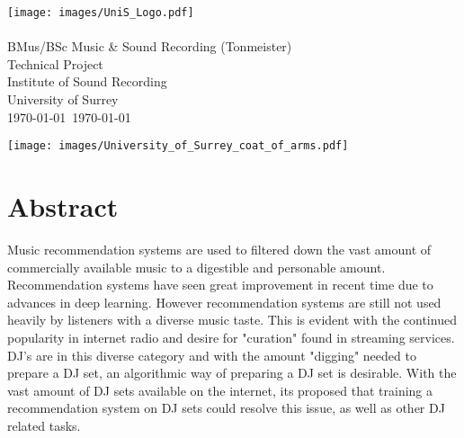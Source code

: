
\graphicspath{{FrontMatter/}}

\begin{titlepage}
\thispagestyle{empty}
\hfill\texttt{[image: images/UniS\_Logo.pdf]}
{\sf
\centering
\null\vfil\vfil
	{
		\huge\LongTitle\\
	}
\vfil\vfil\vfil
	{
		\Large\Me\\
	}
\vfil\vfil\vfil
	{
		\Large{}BMus/BSc Music \& Sound Recording (Tonmeister)\\
		Technical Project\\
	}
\vfil\vfil
	{
		\Large{}Institute of Sound Recording\\
		University of Surrey\\
	}
\vfil
	{
		\Large\MyMonth\today~\MyYear\today\\}
	}

	{
		\texttt{[image: images/University\_of\_Surrey\_coat\_of\_arms.pdf]}
		\vspace{-.4in}
	}
\end{titlepage}

\setlength{\parskip}{1ex plus 0.2ex minus 0.2ex} %
\onehalfspacing



\chapter*{Abstract}
\thispagestyle{empty}
\setcounter{page}{2}

Music recommendation systems are used to filtered down the vast amount of commercially available music to a digestible and personable amount. Recommendation systems have seen great improvement in recent time due to advances in deep learning. However recommendation systems are still not used heavily by listeners with a diverse music taste. This is evident with the continued popularity in internet radio and desire for "curation" found in streaming services. DJ's are in this diverse category and with the amount "digging" needed to prepare a DJ set, an algorithmic way of preparing a DJ set is desirable. With the vast amount of DJ sets available on the internet, its proposed that training a recommendation system on DJ sets could resolve this issue, as well as other DJ related tasks.

